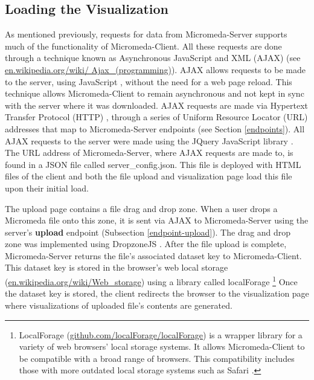 \subsection{Loading the Visualization}

As mentioned previously, requests for data from Micromeda-Server supports much of the functionality of Micromeda-Client. All these requests are done through a technique known as Asynchronous JavaScript and XML (AJAX) \cite{garrett2005ajax,li2012jquery} (see \href{en.wikipedia.org/wiki/Ajax\_(programming)}{en.wikipedia.org/wiki/ Ajax\_(programming)}). AJAX allows requests to be made to the server, using JavaScript \cite{flanagan2006javascript}, without the need for a web page reload. This technique allows Micromeda-Client to remain asynchronous and not kept in sync with the server where it was downloaded. AJAX requests are made via Hypertext Transfer Protocol (HTTP) \cite{fielding1999hypertext}, through a series of Uniform Resource Locator (URL) addresses \cite{berners1994rfc} that map to Micromeda-Server endpoints (see Section \ref{endpoints}). All AJAX requests to the server were made using the JQuery JavaScript library \cite{chaffer2013learning,li2012jquery}. The URL address of Micromeda-Server, where AJAX requests are made to, is found in a JSON file called server\_config.json. This file is deployed with HTML files of the client and both the file upload and visualization page load this file upon their initial load.

The upload page contains a file drag and drop zone. When a user drops a Micromeda file onto this zone, it is sent via AJAX to Micromeda-Server using the server's \textbf{upload} endpoint (Subsection \ref{endpoint-upload}). The drag and drop zone was implemented using DropzoneJS \cite{meno}. After the file upload is complete, Micromeda-Server returns the file's associated dataset key to Micromeda-Client. This dataset key is stored in the browser's web local storage \cite{Hickson} (\href{en.wikipedia.org/wiki/Web\_storage}{en.wikipedia.org/wiki/Web\_storage}) using a library called localForage \cite{localforage} \footnote{LocalForage (\href{github.com/localForage/localForage}{github.com/localForage/localForage}) is a wrapper library for a variety of web browsers' local storage systems. It allows Micromeda-Client to be compatible with a broad range of browsers. This compatibility includes those with more outdated local storage systems such as Safari \cite{lawson_2014}.} Once the dataset key is stored, the client redirects the browser to the visualization page where visualizations of uploaded file's contents are generated.

